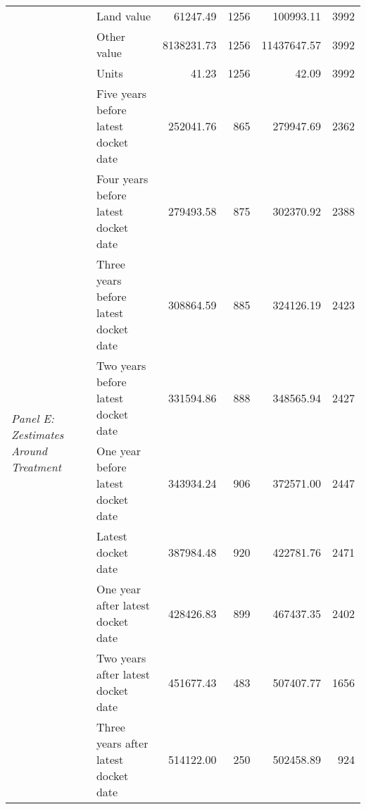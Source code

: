 \begin{table}[H]
\begin{tabular}{llrrrr}
 & Land value & 61247.49 & 1256 & 100993.11 & 3992 \\
 & Other value & 8138231.73 & 1256 & 11437647.57 & 3992 \\
 & Units & 41.23 & 1256 & 42.09 & 3992 \\
\cline{1-6}
\multirow[c]{9}{4cm}{\textit{Panel E: Zestimates Around Treatment}} & Five years before latest docket date & 252041.76 & 865 & 279947.69 & 2362 \\
 & Four years before latest docket date & 279493.58 & 875 & 302370.92 & 2388 \\
 & Three years before latest docket date & 308864.59 & 885 & 324126.19 & 2423 \\
 & Two years before latest docket date & 331594.86 & 888 & 348565.94 & 2427 \\
 & One year before latest docket date & 343934.24 & 906 & 372571.00 & 2447 \\
 & Latest docket date & 387984.48 & 920 & 422781.76 & 2471 \\
 & One year after latest docket date & 428426.83 & 899 & 467437.35 & 2402 \\
 & Two years after latest docket date & 451677.43 & 483 & 507407.77 & 1656 \\
 & Three years after latest docket date & 514122.00 & 250 & 502458.89 & 924 \\
\cline{1-6}
\bottomrule
\end{tabular}
\end{table}
